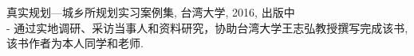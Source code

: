 \begin{cventries}
  \cventry
    {}
    {}
    {}
    {}
    {
      \begin{cvitems}
        \item{真实规划—城乡所规划实习案例集, 台湾大学, 2016, 出版中} \\ %
        	- 通过实地调研、采访当事人和资料研究，协助台湾大学王志弘教授撰写完成该书,该书作者为本人同学和老师. 
      \end{cvitems}
    }
\end{cventries}
